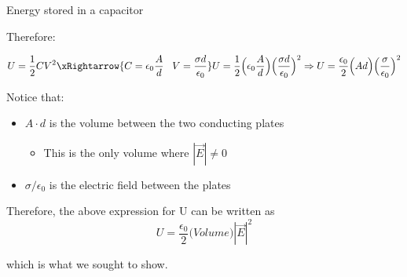 \begin{frame}{Energy stored in a capacitor}

Therefore:

\begin{equation*}
  U = \frac{1}{2} C V^2 \xRightarrow{C = \epsilon_0 \frac{A}{d} \;\;\; V = \frac{\sigma d}{\epsilon_0}}
  U = \frac{1}{2} \Big( \epsilon_0 \frac{A}{d} \Big) \Big( \frac{\sigma d}{\epsilon_0} \Big)^2 \Rightarrow
  U = \frac{\epsilon_0}{2} \Big( A d \Big) \Big( \frac{\sigma}{\epsilon_0} \Big)^2
\end{equation*}

Notice that:
\begin{itemize}
   \item $A{\cdot}d$ is the volume between the two conducting plates
     \begin{itemize}
        \item This is the only volume where $|\vec{E}| \ne 0$
     \end{itemize}
   \item $\sigma/\epsilon_0$ is the electric field between the plates
\end{itemize}

\vspace{0.1cm}

Therefore, the above expression for U can be written as
\begin{equation*}
  U = \frac{\epsilon_0}{2} \Big( Volume \Big) |\vec{E}|^2
\end{equation*}

which is what we sought to show.\\

\end{frame}


%
%

